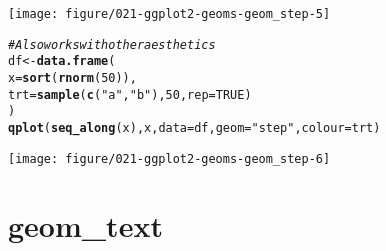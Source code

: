 \documentclass[a4paper,titlepage]{tufte-handout}\usepackage[]{graphicx}\usepackage[]{color}
\makeatletter
\def\maxwidth{ %
  \ifdim\Gin@nat@width>\linewidth
    \linewidth
  \else
    \Gin@nat@width
  \fi
}
\newcommand{\hlnum}[1]{\textcolor[rgb]{0.686,0.059,0.569}{#1}}%
\newcommand{\hlstr}[1]{\textcolor[rgb]{0.192,0.494,0.8}{#1}}%
\newcommand{\hlcom}[1]{\textcolor[rgb]{0.678,0.584,0.686}{\textit{#1}}}%
\newcommand{\hlstd}[1]{\textcolor[rgb]{0.345,0.345,0.345}{#1}}%
\newcommand{\hlkwb}[1]{\textcolor[rgb]{0.69,0.353,0.396}{#1}}%
\newcommand{\hlkwc}[1]{\textcolor[rgb]{0.333,0.667,0.333}{#1}}%
\newcommand{\hlkwd}[1]{\textcolor[rgb]{0.737,0.353,0.396}{\textbf{#1}}}%
\newenvironment{kframe}{%
 \def\at@end@of@kframe{}%
 \ifinner\ifhmode%
  \def\at@end@of@kframe{\end{minipage}}%
  \begin{minipage}{\columnwidth}%
 \fi\fi%
 \def\FrameCommand##1{\hskip\@totalleftmargin \hskip-\fboxsep
 \colorbox{shadecolor}{##1}\hskip-\fboxsep
     \hskip-\linewidth \hskip-\@totalleftmargin \hskip\columnwidth}%
 \MakeFramed {\advance\hsize-\width
   \@totalleftmargin\z@ \linewidth\hsize
   \@setminipage}}%
 {\par\unskip\endMakeFramed%
 \at@end@of@kframe}
\newenvironment{knitrout}{}{} %
\makeatother
\begin{document}
\begin{knitrout}
\begin{kframe}
\end{kframe}
\texttt{[image: figure/021-ggplot2-geoms-geom\_step-5]} 
\begin{kframe}\begin{alltt}
\hlcom{# Also works with other aesthetics}
\hlstd{df} \hlkwb{<-} \hlkwd{data.frame}\hlstd{(}
  \hlkwc{x} \hlstd{=} \hlkwd{sort}\hlstd{(}\hlkwd{rnorm}\hlstd{(}\hlnum{50}\hlstd{)),}
  \hlkwc{trt} \hlstd{=} \hlkwd{sample}\hlstd{(}\hlkwd{c}\hlstd{(}\hlstr{"a"}\hlstd{,} \hlstr{"b"}\hlstd{),} \hlnum{50}\hlstd{,} \hlkwc{rep} \hlstd{=} \hlnum{TRUE}\hlstd{)}
\hlstd{)}
\hlkwd{qplot}\hlstd{(}\hlkwd{seq_along}\hlstd{(x), x,} \hlkwc{data} \hlstd{= df,} \hlkwc{geom}\hlstd{=}\hlstr{"step"}\hlstd{,} \hlkwc{colour} \hlstd{= trt)}
\end{alltt}
\end{kframe}
\texttt{[image: figure/021-ggplot2-geoms-geom\_step-6]} 

\end{knitrout}


\section{geom\_text}
\end{document}
